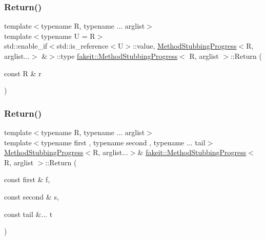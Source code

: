 \mbox{\label{structfakeit_1_1MethodStubbingProgress_ab20141c6f552c3aa3399660c520c2ba4}} 
\subsubsection{\texorpdfstring{Return()}{Return()}\hspace{0.1cm}{\footnotesize\ttfamily [12/45]}}
{\footnotesize\ttfamily template$<$typename R, typename ... arglist$>$ \\
template$<$typename U  = R$>$ \\
std\+::enable\+\_\+if$<$std\+::is\+\_\+reference$<$U$>$\+::value, \mbox{\hyperlink{structfakeit_1_1MethodStubbingProgress}{Method\+Stubbing\+Progress}}$<$R, arglist...$>$ \&$>$\+::type \mbox{\hyperlink{structfakeit_1_1MethodStubbingProgress}{fakeit\+::\+Method\+Stubbing\+Progress}}$<$ R, arglist $>$\+::Return (\begin{DoxyParamCaption}\item[{const R \&}]{r }\end{DoxyParamCaption})\hspace{0.3cm}{\ttfamily [inline]}}

\mbox{\label{structfakeit_1_1MethodStubbingProgress_ae8417ec5f29f70be1ae914755b05e4db}} 
\subsubsection{\texorpdfstring{Return()}{Return()}\hspace{0.1cm}{\footnotesize\ttfamily [13/45]}}
{\footnotesize\ttfamily template$<$typename R, typename ... arglist$>$ \\
template$<$typename first , typename second , typename ... tail$>$ \\
\mbox{\hyperlink{structfakeit_1_1MethodStubbingProgress}{Method\+Stubbing\+Progress}}$<$R, arglist...$>$\& \mbox{\hyperlink{structfakeit_1_1MethodStubbingProgress}{fakeit\+::\+Method\+Stubbing\+Progress}}$<$ R, arglist $>$\+::Return (\begin{DoxyParamCaption}\item[{const first \&}]{f,  }\item[{const second \&}]{s,  }\item[{const tail \&...}]{t }\end{DoxyParamCaption})\hspace{0.3cm}{\ttfamily [inline]}}

